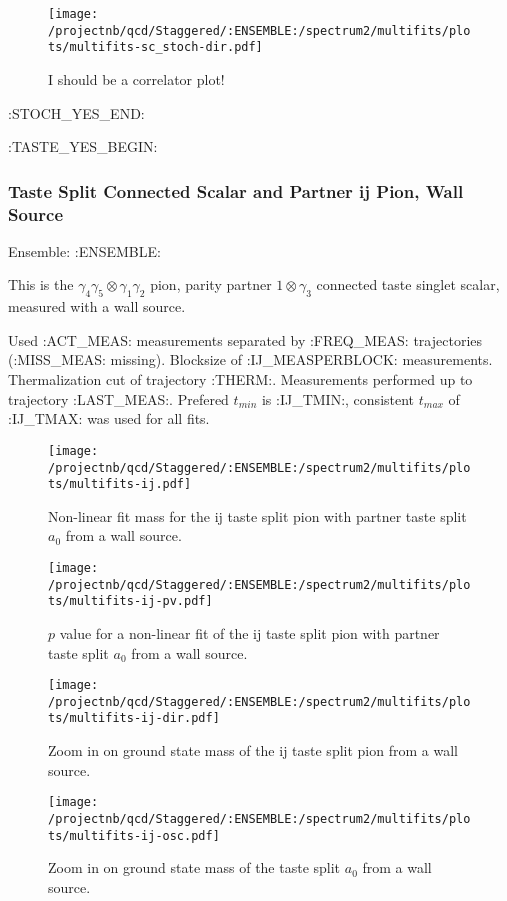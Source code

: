 \begin{figure}[H]
\centering
\texttt{[image: /projectnb/qcd/Staggered/:ENSEMBLE:/spectrum2/multifits/plots/multifits-sc\_stoch-dir.pdf]}
\caption{I should be a correlator plot!}
\end{figure}

\clearpage
:STOCH_YES_END:

:TASTE_YES_BEGIN:
\subsubsection{Taste Split Connected Scalar and Partner ij Pion, Wall Source}

Ensemble: :ENSEMBLE:

This is the $\gamma_4 \gamma_5 \otimes \gamma_1 \gamma_2$ pion, parity partner $1 \otimes \gamma_3$ connected taste singlet scalar, measured with a wall source. 

{\small{Used :ACT_MEAS: measurements separated by :FREQ_MEAS: trajectories (:MISS_MEAS: missing). Blocksize of :IJ_MEASPERBLOCK: measurements. Thermalization cut of trajectory :THERM:. Measurements performed up to trajectory :LAST_MEAS:. Prefered $t_{min}$ is :IJ_TMIN:, consistent $t_{max}$ of :IJ_TMAX: was used for all fits.}}

\begin{multicols}{2}
\begin{figure}[H]
\centering
\texttt{[image: /projectnb/qcd/Staggered/:ENSEMBLE:/spectrum2/multifits/plots/multifits-ij.pdf]}
\caption{Non-linear fit mass for the ij taste split pion with partner taste split $a_0$ from a wall source.}
\end{figure}
\columnbreak
\begin{figure}[H]
\centering
\texttt{[image: /projectnb/qcd/Staggered/:ENSEMBLE:/spectrum2/multifits/plots/multifits-ij-pv.pdf]}
\caption{$p$ value for a non-linear fit of the ij taste split pion with partner taste split $a_0$ from a wall source.}
\end{figure}
\end{multicols}

\begin{multicols}{2}
\begin{figure}[H]
\centering
\texttt{[image: /projectnb/qcd/Staggered/:ENSEMBLE:/spectrum2/multifits/plots/multifits-ij-dir.pdf]}
\caption{Zoom in on ground state mass of the ij taste split pion from a wall source.}
\end{figure}
\columnbreak
\begin{figure}[H]
\centering
\texttt{[image: /projectnb/qcd/Staggered/:ENSEMBLE:/spectrum2/multifits/plots/multifits-ij-osc.pdf]}
\caption{Zoom in on ground state mass of the taste split $a_0$ from a wall source.}
\end{figure}
\end{multicols}


